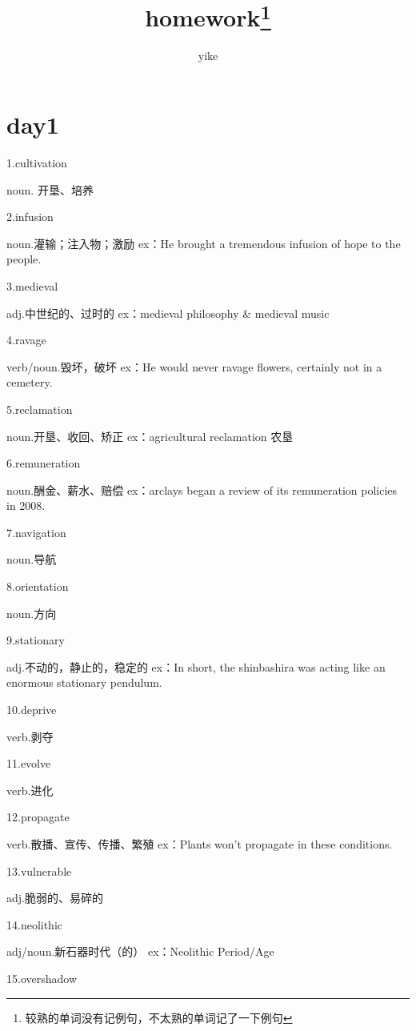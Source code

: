 \documentclass[a4paper, 10pt]{article}
\begin{document}
\title{{ \textbf {homework}\footnote{较熟的单词没有记例句，不太熟的单词记了一下例句}}}
  \author{yike}
  \date{}
  
  \maketitle

\section{day1}
1.cultivation

noun. 开垦、培养

2.infusion 

noun.灌输；注入物；激励 ex：He brought a tremendous infusion of hope to the people.

3.medieval 

adj.中世纪的、过时的 ex：medieval philosophy \& medieval music


4.ravage

verb/noun.毁坏，破坏 ex：He would never ravage flowers, certainly not in a cemetery.


5.reclamation

noun.开垦、收回、矫正 ex：agricultural reclamation  农垦

6.remuneration 

noun.酬金、薪水、赔偿 ex：arclays began a review of its remuneration policies in 2008.


7.navigation

noun.导航

8.orientation

noun.方向

9.stationary

adj.不动的，静止的，稳定的 ex：In short, the shinbashira was acting like an enormous stationary pendulum.

10.deprive 

verb.剥夺

11.evolve 

verb.进化

12.propagate

verb.散播、宣传、传播、繁殖 ex：Plants won't propagate in these conditions.

13.vulnerable 

adj.脆弱的、易碎的

14.neolithic 

adj/noun.新石器时代（的） ex：Neolithic Period/Age

15.overshadow 
\end{document}
